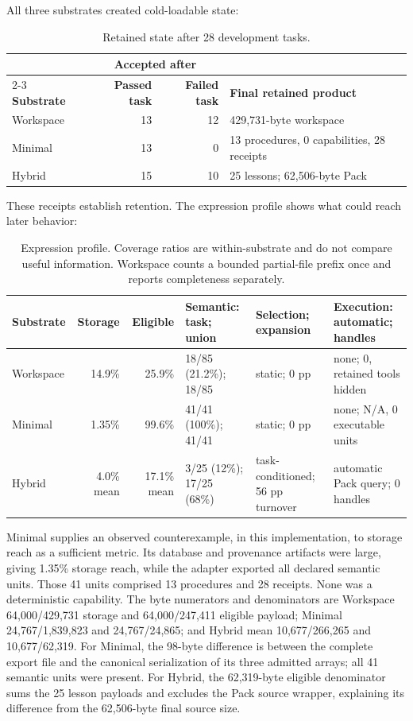 \documentclass[10pt,twocolumn]{article}
\begin{document}
All three substrates created cold-loadable state:

\begin{table}[t]
\caption{Retained state after 28 development tasks.}
\label{tab:retention}
\centering\scriptsize
\begin{tabularx}{\columnwidth}{@{}lrrX@{}}
\toprule
 & \multicolumn{2}{c}{\textbf{Accepted after}} & \\
\cmidrule(lr){2-3}
\textbf{Substrate} & \textbf{Passed task} & \textbf{Failed task} & \textbf{Final retained product}\\
\midrule
Workspace & 13 & 12 & 429,731-byte workspace\\
Minimal & 13 & 0 & 13 procedures, 0 capabilities, 28 receipts\\
Hybrid & 15 & 10 & 25 lessons; 62,506-byte Pack\\
\bottomrule
\end{tabularx}
\end{table}

These receipts establish retention. The expression profile shows what
could reach later behavior:

\begin{table}[t]
\caption{Expression profile. Coverage ratios are within-substrate and do not compare useful information. Workspace counts a bounded partial-file prefix once and reports completeness separately.}
\label{tab:expression}
\centering\tiny
\setlength{\tabcolsep}{3pt}
\begin{tabularx}{\textwidth}{@{}lrrXXX@{}}
\toprule
\textbf{Substrate} & \textbf{Storage} & \textbf{Eligible} & \textbf{Semantic: task; union} & \textbf{Selection; expansion} & \textbf{Execution: automatic; handles}\\
\midrule
Workspace & 14.9\% & 25.9\% & 18/85 (21.2\%); 18/85 & static; 0 pp & none; 0, retained tools hidden\\
Minimal & 1.35\% & 99.6\% & 41/41 (100\%); 41/41 & static; 0 pp & none; N/A, 0 executable units\\
Hybrid & 4.0\% mean & 17.1\% mean & 3/25 (12\%); 17/25 (68\%) & task-conditioned; 56 pp turnover & automatic Pack query; 0 handles\\
\bottomrule
\end{tabularx}
\end{table}

Minimal supplies an observed counterexample, in this implementation, to
storage reach as a sufficient metric. Its database and provenance
artifacts were large, giving 1.35\% storage reach, while the adapter
exported all declared semantic units. Those 41 units comprised 13
procedures and 28 receipts. None was a deterministic capability. The
byte numerators and denominators are Workspace 64,000/429,731 storage
and 64,000/247,411 eligible payload; Minimal 24,767/1,839,823 and
24,767/24,865; and Hybrid mean 10,677/266,265 and 10,677/62,319. For
Minimal, the 98-byte difference is between the complete export file and
the canonical serialization of its three admitted arrays; all 41
semantic units were present. For Hybrid, the 62,319-byte eligible
denominator sums the 25 lesson payloads and excludes the Pack source
wrapper, explaining its difference from the 62,506-byte final source
size.
\end{document}
